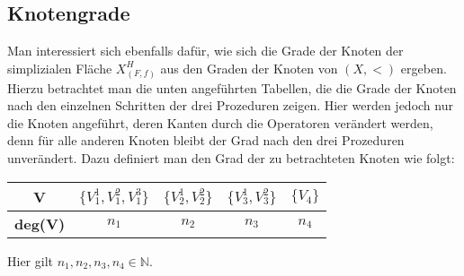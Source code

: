 \documentclass[12pt,titlepage]{article}
\begin{document}
\begin{comment}
\begin{itemize}
\item Man führt einen 
\end{itemize}
 
\end{proof}
Für den Beweis machen wir ebenfalls Gebrauch von folgendem Satz (Whitney)$\textcolor{red}{!!}$
\begin{satz}
Die Operation Wanderinghole ist transitiv. Das heißt für beliebige geschlossene simpliziale Flächen $(X,<)$ und $(Y,\prec)$ mit $\vert X_2 \vert=\vert Y_2 \vert$ existiert eine Lochwanderungssequenz $\Sigma$ so, dass $[Y]=[X^H_{\Sigma}]$ ist.
\end{satz}
\begin{proof}$\textcolor{red}{!!}$
Seien $(X,<)$ und $(Y,\prec)$ simpliziale Flächen mit $\vert X \vert=\vert Y \vert$. Man kann zunächst ohne Einschränkung $X_2=Y_2=\{F_1,\ldots,F_n\}$ für ein $n\in \mathbb{N}$ annehmen.
\end{proof}
\end{comment}


\subsection{Knotengrade}
Man interessiert sich ebenfalls dafür, wie sich die Grade der Knoten der simplizialen Fläche $X^H_{(F,f)}$ aus den Graden der Knoten von $(X,<)$ ergeben. Hierzu betrachtet man die unten angeführten Tabellen, die die Grade der Knoten nach den einzelnen Schritten der drei Prozeduren zeigen. Hier werden jedoch nur die Knoten angeführt, deren Kanten durch die Operatoren verändert werden, denn für alle anderen Knoten bleibt der Grad nach den drei Prozeduren unverändert. Dazu definiert man den Grad der zu betrachteten Knoten wie folgt:\\
\begin{center}
\begin{tabular}{|c|c|c|c|c|}
\hline
  \textbf{V} & $\{V_1^1,V_1^2,V_1^3\}$ & $\{V_2^1,V_2^2\}$& $\{V_3^1,V_3^2\}$& $\{V_4\}$\\ 
  \hline
   \textbf{deg(V)} & $n_1$ & $n_2$ & $n_3$ & $n_4$ \\  
   \hline
 \end{tabular}
 \end{center}
  Hier gilt $n_1,n_2,n_3,n_4 \in \mathbb{N}$.\\
  
\end{document}
